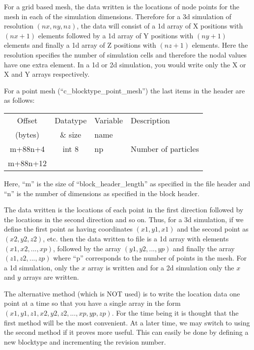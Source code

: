 \documentclass[12pt]{article}
\begin{document}
For a grid based mesh, the data written is the locations of node points for
the mesh in each of the simulation dimensions. Therefore for a
3d simulation of resolution $(nx,ny,nz)$, the data will consist of 
a 1d array of X positions with $(nx+1)$ elements followed by a 1d array of
Y positions with $(ny+1)$ elements and finally a 1d array of Z positions with
$(nz+1)$ elements. Here the resolution specifies the number of simulation cells
and therefore the nodal values have one extra element. In a 1d or 2d simulation,
you would write only the X or X and Y arrays respectively.

For a point mesh (``c\_blocktype\_point\_mesh'') the last items in the header
are as follows:\\

\begin{center}
\begin{tabularx}{0.9\textwidth}[!hbt]{cclX}
  Offset & Datatype & Variable & Description\\
  (bytes) & \& size & name &
  \\\toprule

  m+88n+4 & int 8 & np & Number of particles
  \\\midrule

  m+88n+12 &
\end{tabularx}
\end{center}\vspace{10pt}

Here, ``m'' is the size of ``block\_header\_length'' as specified in the file
header and ``n'' is the number of dimensions as specified in the block header.

The data written is the locations of each point in the first direction followed
by the locations in the second direction and so on.
Thus, for a 3d simulation, if we define the first point as having coordinates
$(x1,y1,x1)$ and the second point as $(x2,y2,z2)$, etc. then the data written
to file is a 1d array with elements $(x1,x2, ... ,xp)$, followed by the array
$(y1,y2, ... ,yp)$ and finally the array $(z1,z2, ... ,zp)$ where
``p'' corresponds to the number of points in the mesh. For a 1d simulation,
only the $x$ array is written and for a 2d simulation only the $x$ and $y$
arrays are written.

The alternative method (which is NOT used) is to write the location data
one point at a time so that you have a single array in the form
$(x1,y1,z1,x2,y2,z2, ... ,xp,yp,zp)$. For the time being it is thought that
the first method will be the most convenient. At a later time, we may switch
to using the second method if it proves more useful. This can easily be done
by defining a new blocktype and incrementing the revision number.
\end{document}
